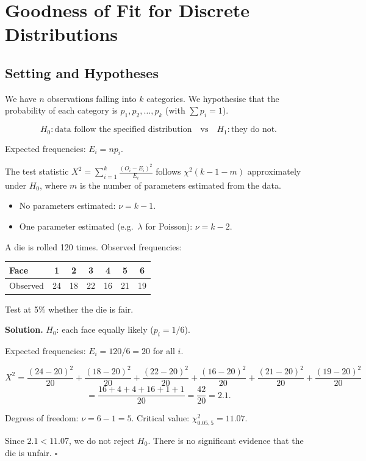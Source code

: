 \documentclass[12pt, a4paper, oneside]{book}
\theoremstyle{definition}
\theoremstyle{plain}
\theoremstyle{remark}
\newenvironment{solution}
  {\par\medskip\noindent\textbf{Solution.}\quad}
  {\hfill$\square$\par\medskip}
\begin{document}
\section{Goodness of Fit for Discrete Distributions}
\label{sec:gof-discrete}

\subsection{Setting and Hypotheses}

We have $n$ observations falling into $k$ categories.  We hypothesise that
the probability of each category is $p_1,p_2,\ldots,p_k$ (with $\sum p_i=1$).

\[
  H_0: \text{data follow the specified distribution}
  \quad\text{vs}\quad
  H_1: \text{they do not.}
\]

Expected frequencies: $E_i = np_i$.

The test statistic $X^2 = \sum_{i=1}^k \frac{(O_i-E_i)^2}{E_i}$ follows
$\chi^2(k-1-m)$ approximately under $H_0$, where $m$ is the number of
parameters estimated from the data.

\begin{itemize}
  \item No parameters estimated: $\nu = k-1$.
  \item One parameter estimated (e.g.\ $\lambda$ for Poisson): $\nu = k-2$.
\end{itemize}

\begin{workedexample}
A die is rolled 120 times.  Observed frequencies:
\begin{center}
\begin{tabular}{lcccccc}
\toprule
Face      & 1  & 2  & 3  & 4  & 5  & 6 \\
\midrule
Observed  & 24 & 18 & 22 & 16 & 21 & 19 \\
\bottomrule
\end{tabular}
\end{center}
Test at 5\% whether the die is fair.

\begin{solution}
$H_0$: each face equally likely ($p_i=1/6$).

Expected frequencies: $E_i = 120/6 = 20$ for all $i$.

\[
  X^2 = \frac{(24-20)^2}{20}+\frac{(18-20)^2}{20}+\frac{(22-20)^2}{20}
       +\frac{(16-20)^2}{20}+\frac{(21-20)^2}{20}+\frac{(19-20)^2}{20}
\]
\[
  = \frac{16+4+4+16+1+1}{20} = \frac{42}{20} = 2.1.
\]

Degrees of freedom: $\nu = 6-1 = 5$.  Critical value: $\chi^2_{0.05,5}=11.07$.

Since $2.1 < 11.07$, we do not reject $H_0$.  There is no significant
evidence that the die is unfair.
\end{solution}
\end{workedexample}
\end{document}
